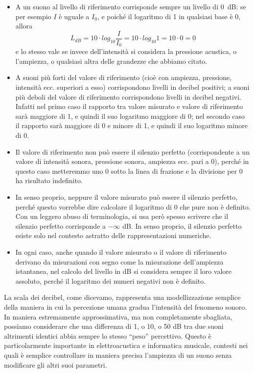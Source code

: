 \documentclass[11pt]{report}
\begin{document}
\begin{itemize}

\item A un suono al livello di riferimento corrisponde sempre un livello di \qty{0}{dB}: se per esempio $I$ è uguale a $I_0$, e poiché il logaritmo di 1 in qualsiasi base è 0, allora
\begin{equation}
L_{dB} = 10 \cdot log_{10}\frac{I}{I_0} = 10 \cdot log_{10}1 = 10 \cdot 0 = 0
\end{equation}
e lo stesso vale se invece dell'intensità si considera la pressione acustica, o l'ampiezza, o qualsiasi altra delle grandezze che abbiamo citato.

\item A suoni più forti del valore di riferimento (cioè con ampiezza, pressione, intensità ecc. superiori a esso) corrispondono livelli in decibel positivi; a suoni più deboli del valore di riferimento corrispondono livelli in decibel negativi. Infatti nel primo caso il rapporto tra valore misurato e valore di riferimento sarà maggiore di 1, e quindi il suo logaritmo maggiore di 0; nel secondo caso il rapporto sarà maggiore di 0 e minore di 1, e quindi il suo logaritmo minore di 0.

\item Il valore di riferimento non può essere il silenzio perfetto (corrispondente a un valore di intensità sonora, pressione sonora, ampiezza ecc. pari a 0), perché in questo caso metteremmo uno 0 sotto la linea di frazione e la divisione per 0 ha risultato indefinito.

\item In senso proprio, neppure il valore misurato può essere il silenzio perfetto, perché questo vorrebbe dire calcolare il logaritmo di 0 che pure non è definito. Con un leggero abuso di terminologia, si usa però spesso scrivere che il silenzio perfetto corrisponde a $-\infty$ dB. In senso proprio, il silenzio perfetto esiste solo nel contesto astratto delle rappresentazioni numeriche.

\item In ogni caso, anche quando il valore misurato o il valore di riferimento derivano da misurazioni con segno come la misurazione dell'ampiezza istantanea, nel calcolo del livello in dB si considera sempre il loro valore assoluto, perché il logaritmo dei numeri negativi non è definito.

\end{itemize}

La scala dei decibel, come dicevamo, rappresenta una modellizzazione semplice della maniera in cui la percezione umana gradua l'intensità del fenomeno sonoro. In maniera estremamente approssimativa, ma non completamente sbagliata, possiamo considerare che una differenza di 1, o 10, o 50 dB tra due suoni altrimenti identici abbia sempre lo stesso ``peso'' percettivo. Questo è particolarmente importante in elettroacustica e informatica musicale, contesti nei quali è semplice controllare in maniera precisa l'ampiezza di un suono senza modificare gli altri suoi parametri. 
\end{document}
